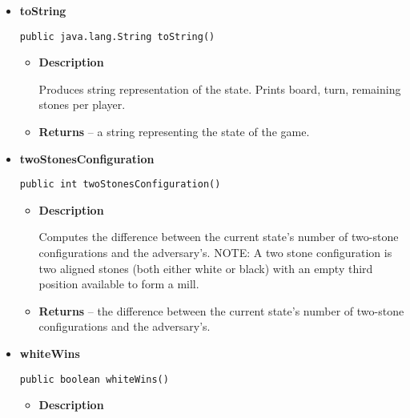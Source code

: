 \documentclass[11pt,a4paper]{report}
\begin{document}
{{{{{{{{{{{\begin{itemize}
{\begin{itemize}
{Computes the difference between the current state's number of three-stone configurations and the adversary's. NOTE: A three stone configuration is two two-stone configurations joint together by a stone present in both two-stone configurations.
}
\item{{\bf  Returns} -- 
the difference between the current state's number of three-stone configurations and the adversary's. 
}%
\end{itemize}
}%
\item{ 
{\bf  toString}\\
\begin{lstlisting}[frame=none]
public java.lang.String toString()\end{lstlisting} %
\begin{itemize}
\item{
{\bf  Description}

Produces string representation of the state. Prints board, turn, remaining stones per player.
}
\item{{\bf  Returns} -- 
a string representing the state of the game. 
}%
\end{itemize}
}%
\item{ 
{\bf  twoStonesConfiguration}\\
\begin{lstlisting}[frame=none]
public int twoStonesConfiguration()\end{lstlisting} %
\begin{itemize}
\item{
{\bf  Description}

Computes the difference between the current state's number of two-stone configurations and the adversary's. NOTE: A two stone configuration is two aligned stones (both either white or black) with an empty third position available to form a mill.
}
\item{{\bf  Returns} -- 
the difference between the current state's number of two-stone configurations and the adversary's. 
}%
\end{itemize}
}%
\item{ 
{\bf  whiteWins}\\
\begin{lstlisting}[frame=none]
public boolean whiteWins()\end{lstlisting} %
\begin{itemize}
\item{
{\bf  Description}

}
\end{itemize}}
\end{itemize}}}}}}}}}}}}
\end{document}
